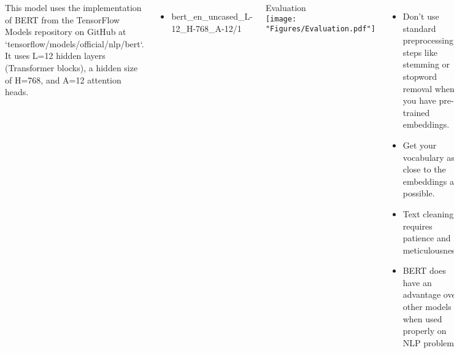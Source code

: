 \documentclass{tikzposter} %
\begin{document}
\begin{columns}
{
This model uses the implementation of BERT from the TensorFlow Models 
repository on GitHub at `tensorflow/models/official/nlp/bert`. It uses 
L=12 hidden layers (Transformer blocks), a hidden size of H=768, and A=12 attention heads.
\begin{itemize}
	\item bert\_en\_uncased\_L-12\_H-768\_A-12/1
\end{itemize}
\begin{center}
	Evaluation\\
	\texttt{[image: "Figures/Evaluation.pdf"]}
\end{center}
}


{
\begin{itemize}
	\item Don't use standard preprocessing steps like stemming or 
	stopword removal when you have pre-trained embeddings.
	\item Get your vocabulary as close to the embeddings as possible.
	\item Text cleaning requires patience and meticulousness. 
	\item BERT does have an advantage over other models when 
	used properly on NLP problems.
\end{itemize}
}





\end{columns}
\end{document}
